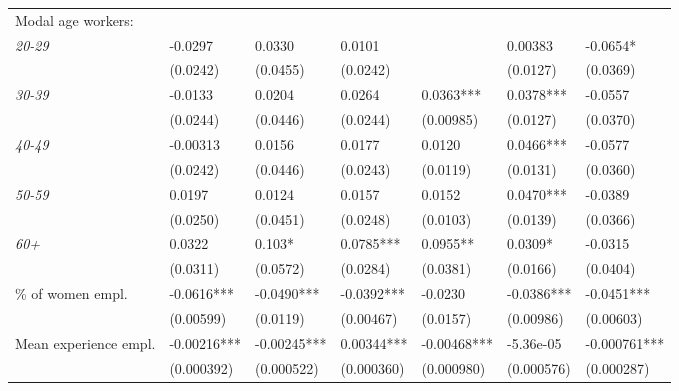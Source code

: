 \documentclass[12pt]{article}
\begin{document}
\begin{table}[hbt]
{\begin{threeparttable}
\begin{tabular}{l*{6}{l}}
\cmidrule(lr){1-7}
Modal age workers:                          \\[1ex]
\quad \textit{20-29}                        &       -0.0297     & 0.0330      & 0.0101     &             & 0.00383    & -0.0654*     \\
                                            &       (0.0242)    & (0.0455)    & (0.0242)   &             & (0.0127)   & (0.0369)     \\[1ex]
\quad \textit{30-39}                        &       -0.0133     & 0.0204      & 0.0264     & 0.0363***   & 0.0378***  & -0.0557      \\
                                            &       (0.0244)    & (0.0446)    & (0.0244)   & (0.00985)   & (0.0127)   & (0.0370)     \\[1ex]
\quad \textit{40-49}                        &       -0.00313    & 0.0156      & 0.0177     & 0.0120      & 0.0466***  & -0.0577      \\
                                            &       (0.0242)    & (0.0446)    & (0.0243)   & (0.0119)    & (0.0131)   & (0.0360)     \\[1ex]
\quad \textit{50-59}                        &       0.0197      & 0.0124      & 0.0157     & 0.0152      & 0.0470***  & -0.0389      \\
                                            &       (0.0250)    & (0.0451)    & (0.0248)   & (0.0103)    & (0.0139)   & (0.0366)     \\[1ex]
\quad \textit{60+}                          &       0.0322      & 0.103*      & 0.0785***  & 0.0955**    & 0.0309*    & -0.0315      \\
                                            &       (0.0311)    & (0.0572)    & (0.0284)   & (0.0381)    & (0.0166)   & (0.0404)     \\[1ex]
\% of women empl.                           &       -0.0616***  & -0.0490***  & -0.0392*** & -0.0230     & -0.0386*** & -0.0451***   \\
                                            &       (0.00599)   & (0.0119)    & (0.00467)  & (0.0157)    & (0.00986)  & (0.00603)    \\[1ex]
Mean experience empl.                       &       -0.00216*** & -0.00245*** & 0.00344*** & -0.00468*** & -5.36e-05  & -0.000761*** \\
                                            &       (0.000392)  & (0.000522)  & (0.000360) & (0.000980)  & (0.000576) & (0.000287)   \\[1ex]

\end{tabular}
\end{threeparttable}}
\end{table}
\end{document}
